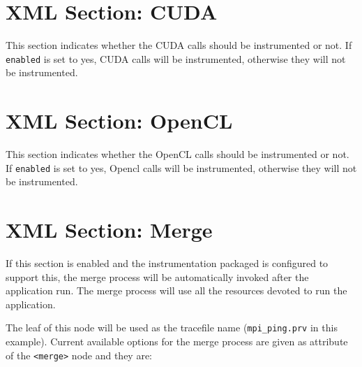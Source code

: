 \section{XML Section: CUDA}\label{sec:XMLSectionCUDA}



This section indicates whether the CUDA calls should be instrumented or not. If {\tt enabled} is set to yes, CUDA calls will be instrumented, otherwise they will not be instrumented.

\section{XML Section: OpenCL}\label{sec:XMLSectionOPENCL}



This section indicates whether the OpenCL calls should be instrumented or not. If {\tt enabled} is set to yes, Opencl calls will be instrumented, otherwise they will not be instrumented.

\section{XML Section: Merge}\label{sec:XMLSectionMerge}



If this section is enabled and the instrumentation packaged is configured to support this, the merge process will be automatically invoked after the application run. The merge process will use all the resources devoted to run the application.

The leaf of this node will be used as the tracefile name ({\tt mpi\_ping.prv} in this example). Current available options for the merge process are given as attribute of the {\tt <merge>} node and they are:

